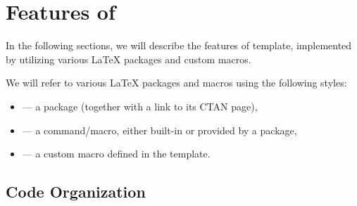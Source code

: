 \chapter{Features of \TeXsis{}} \label{ch:Features}

In the following sections, we will describe the features of \TeXsis{} template, implemented by utilizing various \LaTeX{} packages and custom macros.

\begin{remark}
    We will refer to various \LaTeX{} packages and macros using the following styles:
    \begin{itemize}
        \item {} --- a package (together with a link to its \textsf{CTAN} page),
        \item \macro{\macro} --- a command/macro, either built-in or provided by a package,
        \item \custommacro{\custommacro} --- a custom macro defined in the \TeXsis{} template. \qedhere*
    \end{itemize}
\end{remark}

\section{Code Organization}%
\label{sec:Code Organization}

